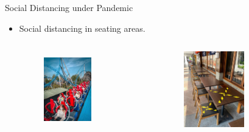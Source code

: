   \begin{frame}{Social Distancing under Pandemic}
    \begin{itemize}
      \item Social distancing in seating areas.
      \begin{columns}[c]  %
        \column{5cm}  %
        \begin{figure}[ht]
          \centering
          \includegraphics[width = 0.8\textwidth, height=0.6\textwidth]{./images/park_social_distancing.jpg}

        \end{figure}
        \column{5cm}
        \scriptsize
        \begin{figure}[ht]
          \centering
          \includegraphics[width=0.8\textwidth,height=0.6\textwidth]{./images/tape_measures.jpg}
        \end{figure}

        \end{columns} 
        

\end{itemize}
\end{frame}
